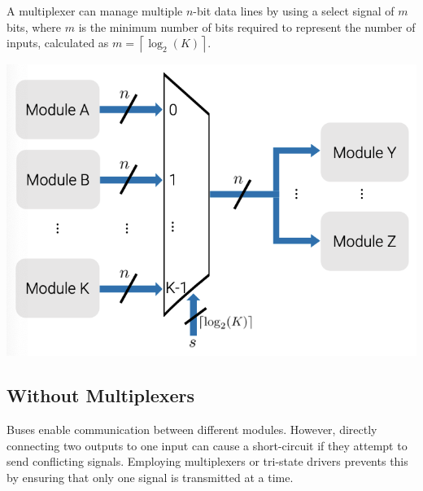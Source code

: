\documentclass[12pt,openany]{book}
\begin{document}
					  \begin{minipage}{0.48\textwidth}
						A multiplexer can manage multiple \(n\)-bit data lines by using a select signal of \(m\) bits, where \(m\) is the minimum number of bits required to represent the number of inputs, calculated as \(m = \left\lceil \log_2(K) \right\rceil\).

					\end{minipage}
					\hfill
					\begin{minipage}{0.48\textwidth}
						\includegraphics[width=\textwidth]{circuits/11.1.1.png} %

					\end{minipage}
					  
					  \subsection{Without Multiplexers} 
					  
					  Buses enable communication between different modules. However, directly connecting two outputs to one input can cause a short-circuit if they attempt to send conflicting signals. Employing multiplexers or tri-state drivers prevents this by ensuring that only one signal is transmitted at a time.
					  
\end{document}
